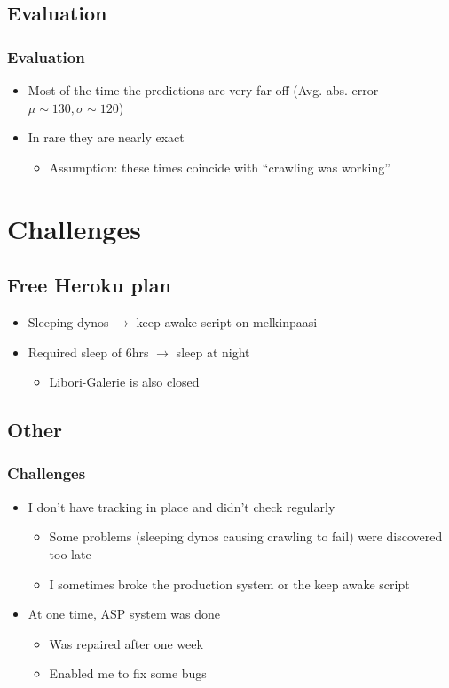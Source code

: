 \documentclass[11pt]{beamer}
\begin{document}
\subsection{Evaluation}
\begin{frame}
  \frametitle{Evaluation}
  \begin{itemize}
    \item Most of the time the predictions are very far off (Avg. abs. error \(\mu \sim 130, \sigma \sim 120\))
    \item In rare they are nearly exact
    \begin{itemize}
      \item Assumption: these times coincide with ``crawling was working''
    \end{itemize}
  \end{itemize}
\end{frame}

\section{Challenges}
\subsection{Free Heroku plan}
\begin{frame}
  \begin{itemize}
  \frametitle{Challenges \& Current solutions}
  	\item Sleeping dynos \(\rightarrow\) keep awake script on melkinpaasi
  	\item Required sleep of 6hrs \(\rightarrow\) sleep at night
  	\begin{itemize}
  	  \item Libori-Galerie is also closed
  	\end{itemize}
  \end{itemize}
\end{frame}

\subsection{Other}
\begin{frame}
  \frametitle{Challenges}
  \begin{itemize}
  	\item I don't have tracking in place and didn't check regularly
  	\begin{itemize}
  	  \item Some problems (sleeping dynos causing crawling to fail) were discovered too late
      \item I sometimes broke the production system or the keep awake script
  	\end{itemize}
  	\item At one time, ASP system was done
    \begin{itemize}
      \item Was repaired after one week
      \item Enabled me to fix some bugs
    \end{itemize}
  \end{itemize}
\end{frame}
\end{document}
